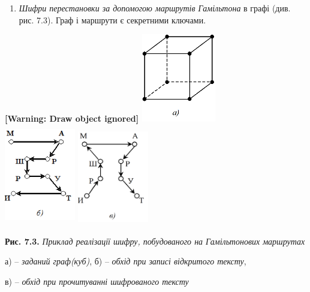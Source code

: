 \documentclass[a4paper]{article}
\newcounter{saveenum}
\newcommand\liststyleWWviiiNumxli{%
\renewcommand\theenumi{\arabic{enumi}}
\renewcommand\theenumii{\alph{enumii}}
\renewcommand\theenumiii{\roman{enumiii}}
\renewcommand\theenumiv{\arabic{enumiv}}
\renewcommand\labelenumi{\theenumi)}
\renewcommand\labelenumii{\theenumii.}
\renewcommand\labelenumiii{\theenumiii.}
\renewcommand\labelenumiv{\theenumiv.}
}
\newcounter{}
\begin{document}
\liststyleWWviiiNumxli
\setcounter{saveenum}{\value{enumi}}
\begin{enumerate}
\setcounter{enumi}{\value{saveenum}}
\item \textit{Шифри перестановки за допомогою маршрутів Гамільтона} в графі
(див. рис. 7.3). Граф і маршрути є секретними ключами.
\end{enumerate}

\bigskip

{\centering\bfseries
[Warning: Draw object ignored]
\includegraphics[width=1.2811in,height=1.5209in]{crypt-img/crypt-img69.png}
\ \ \ \ 
\includegraphics[width=1.2189in,height=1.7335in]{crypt-img/crypt-img70.png} 
\includegraphics[width=1.2189in,height=1.6665in]{crypt-img/crypt-img71.png} 
\par}


\bigskip

{\centering
\textbf{Рис. 7.3. }\textit{Приклад реалізації шифру, побудованого на
Гамільтонових маршрутах}
\par}

{\centering
а) – \textit{заданий граф(куб)}, б) – \textit{обхід при записі відкритого
тексту}, 
\par}

{\centering
в) – \textit{обхід при прочитуванні шифрованого тексту}
\par}
\end{document}
